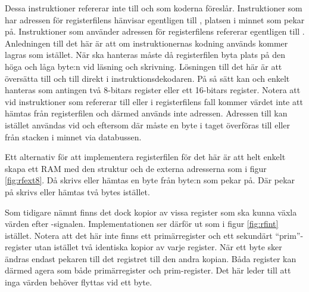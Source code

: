 \documentclass[main.tex]{subfiles}
\begin{document}
Dessa instruktioner refererar inte till  och  som koderna
föreslår. Instruktioner som har adressen för registerfilens  hänvisar
egentligen till , platsen i minnet som  pekar på.
Instruktioner som använder adressen för registerfilens  refererar
egentligen till . Anledningen till det här är att om instruktionernas
kodning används kommer  lagras som  istället. När 
ska hanteras måste då registerfilen byta plats på den höga och låga byte:n vid
läsning och skrivning.  Lösningen till det här är att översätta  till
 och  till  direkt i instruktionsdekodaren. På så
sätt kan  och  enkelt hanteras som antingen två 8-bitars
register eller ett 16-bitars register. Notera att vid instruktioner som
refererar till  eller i registerfilens fall  kommer värdet
inte att hämtas från registerfilen och därmed används inte adressen. Adressen
till  kan istället användas vid  och 
eftersom där måste en byte i taget överföras till eller från stacken i minnet
via databussen.

Ett alternativ för att implementera registerfilen för det här är att helt
enkelt skapa ett RAM med den struktur och de externa adresserna som i figur
\ref{fig:rfext8}. Då skrivs eller hämtas en byte från byte:n som 
pekar på. Där  pekar på skrivs eller hämtas två bytes istället.

Som tidigare nämnt finns det dock kopior av vissa register som ska kunna växla
värden efter -signalen. Implementationen ser därför ut som i
figur \ref{fig:rfint} istället. Notera att det här inte finns ett
primärregister och ett sekundärt ``prim''-register utan istället två identiska
kopior av varje register. När ett byte sker ändras endast pekaren till det
registret till den andra kopian. Båda register kan därmed agera som både
primärregister och prim-register. Det här leder till att inga värden behöver
flyttas vid ett byte.
\end{document}
